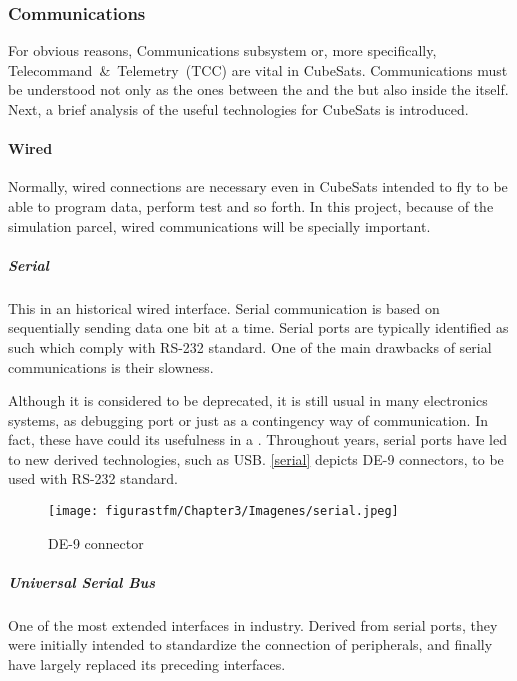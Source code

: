 \subsubsection{Communications}

For obvious reasons, Communications subsystem or, more specifically, Telecommand~\&~Telemetry~(\acrshort{TCC}) are vital in CubeSats. Communications must be understood not only as the ones between the  and the  but also inside the  itself. Next, a brief analysis of the useful technologies for CubeSats is introduced.

\paragraph{Wired}

Normally, wired connections are necessary even in CubeSats intended to fly to be able to program data, perform test and so forth. In this project, because of the simulation parcel, wired communications will be specially important.

\subparagraph{Serial}

This in an historical wired interface. Serial communication is based on sequentially sending data one bit at a time. Serial ports are typically identified as such which comply with RS-232 standard. One of the main drawbacks of serial communications is their slowness.

Although it is considered to be deprecated, it is still usual in many electronics systems, as debugging port or just as a contingency way of communication. In fact, these have could its usefulness in a . Throughout years, serial ports have led to new derived technologies, such as \acrshort{USB}. \autoref{serial} depicts DE-9 connectors, to be used with RS-232 standard.

			\begin{figure} [H] 				
				\centering
				\texttt{[image: figurastfm/Chapter3/Imagenes/serial.jpeg]}
				\caption{DE-9 connector \cite{wiki}} \label{serial}
				\vspace{-1cm}
			\end{figure}


\subparagraph{Universal Serial Bus}

One of the most extended interfaces in industry. Derived from serial ports, they were initially intended to standardize the connection of peripherals, and finally have largely replaced its preceding interfaces.

